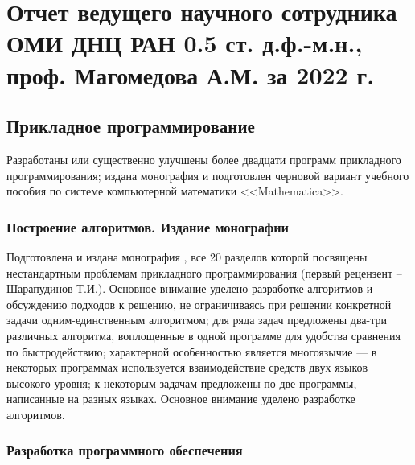 \chapter{Отчет ведущего научного сотрудника ОМИ ДНЦ РАН 0.5 ст. д.ф.-м.н., проф. Магомедова А.М. за 2022 г.}


%
%


\section{Прикладное программирование}

Разработаны или существенно улучшены более двадцати программ прикладного программирования; издана монография и подготовлен черновой вариант  учебного пособия по системе компьютерной математики <<Mathematica>>.


\subsection{Построение алгоритмов. Издание монографии}

Подготовлена и издана монография \cite{akm-bib-m1}, все 20 разделов которой посвящены нестандартным проблемам прикладного программирования (первый рецензент -- Шарапудинов Т.И.).
Основное внимание уделено разработке алгоритмов и обсуждению подходов к решению, не ограничиваясь при решении конкретной задачи одним-единственным алгоритмом; для ряда задач предложены два-три различных алгоритма, воплощенные в одной программе для удобства сравнения по быстродействию; характерной особенностью является многоязычие --- в некоторых программах используется взаимодействие средств двух языков высокого уровня; к некоторым задачам предложены по две программы, написанные на разных языках.
Основное внимание уделено разработке алгоритмов.


\subsection{Разработка программного обеспечения}

